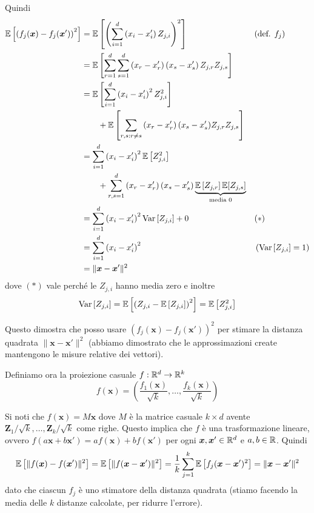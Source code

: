 Quindi
\begin{align*}
    \mathbb{E} \left[\left(f_j(\bm x) - f_j (\bm x')\right)^2\right] & = \mathbb{E} \left[\left(\sum_{i = 1}^d \left(x_i - x_i'\right) Z_{j,i}\right)^2 \right] && (\text{def. } f_j) \\
    &= \mathbb{E} \left[\sum_{r = 1}^d \sum_{s = 1}^d \left(x_r - x_r'\right)\left(x_s - x_s'\right)Z_{j,r} Z_{j,s}\right] \\
    & = \mathbb{E} \left[\sum_{i = 1}^d \left(x_i - x_i'\right)^2 Z_{j,i}^2 \right] \\
    & \qquad + \mathbb{E} \left[\sum_{r,s : r \neq s} \left(x_r - x_r'\right) (x_s - x_s') Z_{j,r} Z_{j,s}\right] \\
    & = \sum_{i = 1}^d \left(x_i - x_i'\right)^2 \mathbb{E} \left[Z_{j,i}^2\right] \\
    & \qquad + \sum_{r,s = 1}^d \left(x_r - x_r'\right)(x_s - x_s') \underbrace{\mathbb{E} \left[Z_{j,r}\right]\mathbb{E}[Z_{j,s}]}_{\text{media } 0} \\
    & = \sum_{i = 1}^d \left(x_i - x_i'\right)^2 \textnormal{Var}\left[Z_{j,i}\right] + 0 && (\ast) \\
    & = \sum_{i = 1}^d \left(x_i - x_i' \right)^2 && \left(\textnormal{Var}\left[Z_{j,i}\right] = 1\right) \\
    & = \|\bm x - \bm x'\|^2
\end{align*}
dove $(\ast)$ vale perché le $Z_{j,i}$ hanno media zero e inoltre
$$ \textnormal{Var}\left[Z_{j,i}\right] = \mathbb{E} \left[\left(Z_{j,i} - \mathbb{E} \left[Z_{j,i}\right]\right)^2 \right] = \mathbb{E} \left[Z_{j,i}^2 \right] $$

Questo dimostra che posso usare $\left(f_j (\bm x) - f_j (\bm x')\right)^2$ per stimare la distanza quadrata $\|\bm x - \bm x'\|^2$ (abbiamo dimostrato che le approssimazioni create mantengono le misure relative dei vettori).

Definiamo ora la proiezione casuale $f: \mathbb{R}^d \rightarrow \mathbb{R}^k$
$$ f(\bm x) = \left(\frac{f_1 (\bm x)}{\sqrt{k}}, \dots, \frac{f_k(\bm x)}{\sqrt{k}}\right) $$

Si noti che $f(\bm x) = M \bm x$ dove $M$ è la matrice casuale $k \times d$ avente $\bm Z_1 / \sqrt{k}, \dots, \bm Z_k / \sqrt{k}$ come righe. Questo implica che $f$ è una trasformazione lineare, ovvero $f (a\bm x + b \bm x' ) = af(\bm x) + bf(\bm x')$ per ogni $\bm x, \bm x' \in \mathbb{R}^d$ e $a,b \in \mathbb{R}$. Quindi
$$ \mathbb{E} \left[\|f(\bm x) - f (\bm x') \|^2 \right] = \mathbb{E} \left[\|f(\bm x - \bm x') \|^2 \right] = \frac{1}{k} \sum_{j = 1}^k \mathbb{E} \left[f_j (\bm x - \bm x')^2 \right] = \|\bm x - \bm x'\|^2 $$
dato che ciascun $f_j$ è uno stimatore della distanza quadrata (stiamo facendo la media delle $k$ distanze calcolate, per ridurre l'errore).

